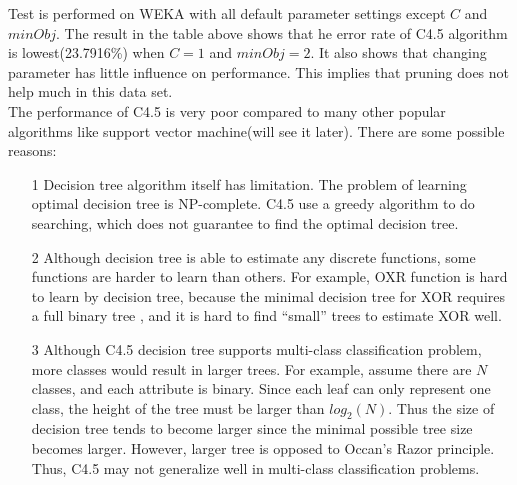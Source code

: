 \documentclass[a4paper,11pt]{article}
\begin{document}
Test is performed on WEKA with all default parameter settings except $C$ and $minObj$. The result in the table above shows that he error rate of C4.5 algorithm is lowest(23.7916\%) when $C=1$ and $minObj=2$. It also shows that changing parameter has little influence on performance. This implies that pruning does not help much in this data set.\\
The performance of C4.5 is very poor compared to many other popular algorithms like support vector machine(will see it later). There are some possible reasons:\\
\begin{enumerate}
\item[1] Decision tree algorithm itself has limitation. The problem of learning optimal decision tree is NP-complete\cite{dtnpc}. C4.5 use a greedy algorithm to do searching, which does not guarantee to find the optimal decision tree.
\item[2] Although decision tree is able to estimate any discrete functions, some functions are harder to learn than others. For example, OXR function is hard to learn by decision tree, because the minimal decision tree for XOR requires a full binary tree , and it is hard to find ``small'' trees to estimate XOR well.
\item[3] Although C4.5 decision tree supports multi-class classification problem, more classes would result in larger trees. For example, assume there are $N$ classes, and each attribute is binary. Since each leaf can only represent one class, the height of the tree must be larger than $log_2(N)$. Thus the size of decision tree tends to become larger since the minimal possible tree size becomes larger. However, larger tree is opposed to Occan's Razor principle. Thus, C4.5 may not generalize well in multi-class classification problems.
\end{enumerate}
\end{document}
